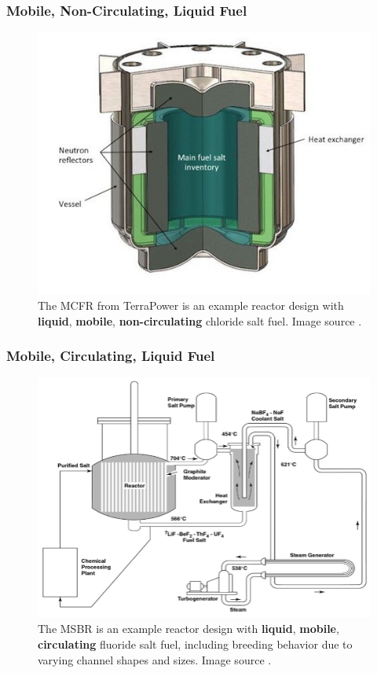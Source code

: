\begin{frame}
        \frametitle{Mobile, Non-Circulating, Liquid Fuel}
               \begin{figure}[t]
                \vspace*{-0.1in}
                \includegraphics[height=0.5\textwidth]{./images/example-mcfr.jpg}
                       \caption{The \gls{MCFR} from TerraPower is an example 
                       reactor design with \textbf{liquid}, \textbf{mobile}, 
                       \textbf{non-circulating} chloride salt fuel. Image 
                       source \cite{terrapower_llc_mcfr_2018,doene_southern_2018}.}
               \end{figure}            
\end{frame}


\begin{frame}
        \frametitle{Mobile, Circulating, Liquid Fuel}
               \begin{figure}[t]
                \vspace*{-0.1in}
                \includegraphics[height=0.5\textwidth]{./images/example-msbr.png}
                       \caption{The \gls{MSBR} \cite{robertson_conceptual_1971} is an example 
                       reactor design with \textbf{liquid}, \textbf{mobile}, 
                       \textbf{circulating} fluoride salt fuel, including 
                       breeding behavior due to varying channel shapes and 
                       sizes. Image 
                       source \cite{rosenthal_molten-salt_1970}.}
               \end{figure}            
\end{frame}


